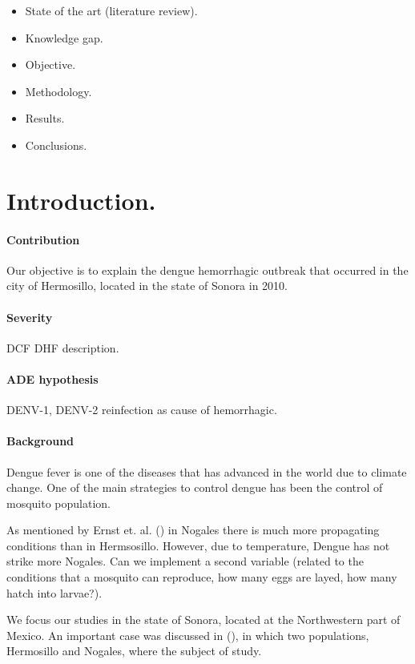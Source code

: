\begin{itemize}
	\item
    	State of the art (literature review).
    \item	
    	Knowledge gap.
    \item	
    	Objective.
    \item
    	Methodology.
    \item	
    	Results.
    \item
    	Conclusions.
\end{itemize}

\section{Introduction.}\label{intro}
\paragraph{Contribution}
Our objective is to explain the dengue hemorrhagic outbreak that 
occurred in the city of Hermosillo, located in the state of Sonora in 2010.
\paragraph{Severity}
\ac{DCF} 
\ac{DHF} description.
\paragraph{ADE hypothesis}
\ac{DENV-1}, \ac{DENV-2}
reinfection as cause of hemorrhagic.
\paragraph{Background}

	Dengue fever is one of the diseases that has advanced in the 
world due to climate change. One of the main strategies to control dengue has been the control of mosquito population.

	As mentioned by Ernst et. al. (\cite{Ernst2016}) in Nogales there 
is much more propagating conditions than in Hermsosillo. However, 
due to temperature, Dengue has not strike more Nogales. Can we 
implement a second variable (related to the conditions that a 
mosquito can reproduce, how many eggs are layed, how many hatch into larvae?).

\noindent We focus our studies in the state of Sonora, located at the Northwestern part of Mexico. An important case was discussed in (\cite{Ernst2016}), in which two populations, Hermosillo and Nogales, where the subject of study.

